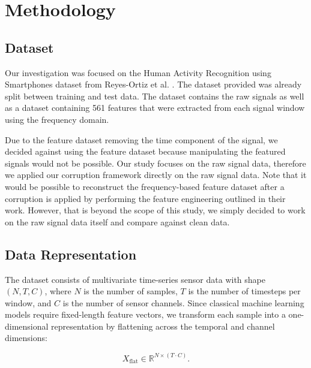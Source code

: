 \section{Methodology}


\subsection{Dataset}
Our investigation was focused on the Human Activity Recognition using Smartphones dataset from
Reyes-Ortiz et al. \cite{reyes-ortiz-2013}. The dataset provided was already split between training
and test data. The dataset contains the raw signals as well as a dataset containing 561 features
that were extracted from each signal window using the frequency domain.

Due to the feature dataset
removing the time component of the signal, we decided against using the feature dataset because
manipulating the featured signals would not be possible. Our study focuses on the raw signal data,
therefore we applied our corruption framework directly on the raw signal data. Note that it would be
possible to reconstruct the frequency-based feature dataset after a corruption is applied by
performing the feature engineering outlined in their work. However, that is beyond the scope
of this study, we simply decided to work on the raw signal data itself and compare against
clean data.

\subsection{Data Representation}
The dataset consists of multivariate time-series sensor data with shape $(N, T, C)$, where $N$ is the number
of samples, $T$ is the number of timesteps per window, and $C$ is the number of sensor
channels.
Since classical machine learning models require fixed-length feature vectors, we transform
each sample into a one-dimensional representation by flattening across the temporal and channel
dimensions:

\[
X_{\text{flat}} \in \mathbb{R}^{N \times (T \cdot C)}.
\]


